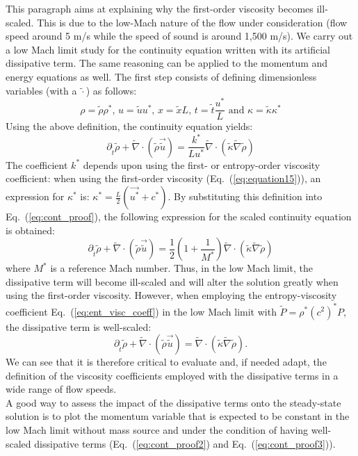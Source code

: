 \documentclass[12pt]{article}
\newcommand{\eqt}[1]{Eq.~(\ref{#1})} %
\begin{document}
This paragraph aims at explaining why the first-order viscosity becomes ill-scaled. This is due to the low-Mach nature of the flow under consideration (flow speed around 5 m/s while the speed of sound is around 1,500 m/s). We carry out a low Mach limit study for the continuity equation written with its artificial dissipative term. The same reasoning can be applied to the momentum and energy equations as well. The first step consists of defining dimensionless variables (with a $\tilde{\cdot}$) as follows:
\begin{equation}
\rho = \tilde{\rho} \rho^* \text{, } u = \tilde{u} u^* \text{, } x = \tilde{x} L \text{, } t = \tilde{t} \frac{u^*}{L} \text{ and } \kappa = \tilde{\kappa} \kappa^* 
\end{equation}
Using the above definition, the continuity equation yields:
\begin{equation}
\label{eq:cont_proof}
\partial_{\tilde{t}} \tilde{\rho} + \tilde{\nabla} \cdot \left( \tilde{\rho} \vec{\tilde{u}} \right) =  \frac{k^*}{L u^*}  \tilde{\nabla}  \cdot  \left( \tilde{\kappa}  \tilde{\nabla} \tilde{\rho} \right)
\end{equation}
The coefficient $k^*$ depends upon using the first- or entropy-order viscosity coefficient: when using the first-order viscosity (\eqt{eq:equation15}), an expression for $\kappa^*$ is: $\kappa^* = \frac{L}{2}\left( \vec{u^*} + c^* \right)$. By substituting this definition into \eqt{eq:cont_proof}, the following expression for the scaled continuity equation is obtained:
\begin{equation}
\label{eq:cont_proof2}
\partial_{\tilde{t}} \tilde{\rho} + \tilde{\nabla} \cdot \left( \tilde{\rho} \vec{\tilde{u}} \right) = \frac{1}{2}\left( 1 + \frac{1}{M^*} \right)  \tilde{\nabla} \cdot \left(\tilde{\kappa}\tilde{\nabla} \tilde{\rho} \right)
\end{equation}
where $M^*$ is a reference Mach number. Thus, in the low Mach limit, the dissipative term will become ill-scaled and will alter the solution greatly
when using the first-order viscosity. However, when employing the entropy-viscosity coefficient \eqt{eq:ent_visc_coeff} in the low Mach limit with 
$\tilde{P} = \rho^* (c^2)^* P$, the dissipative term is well-scaled:
\begin{equation}
\label{eq:cont_proof3}
\partial_{\tilde{t}} \tilde{\rho} + \tilde{\nabla} \cdot \left( \tilde{\rho} \vec{\tilde{u}} \right) =  \tilde{\nabla} \cdot  \left(\tilde{\kappa}\tilde{\nabla}  \tilde{\rho} \right).
\end{equation}
We can see that it is therefore critical to evaluate and, if needed adapt, the definition of the viscosity coefficients employed with the dissipative terms in a wide range of flow speeds. \\
A good way to assess the impact of the dissipative terms onto the steady-state solution is to plot the momentum variable that is expected to be constant in the low Mach limit without mass source and under the condition of having well-scaled dissipative terms (\eqt{eq:cont_proof2} and \eqt{eq:cont_proof3}).
\end{document}
